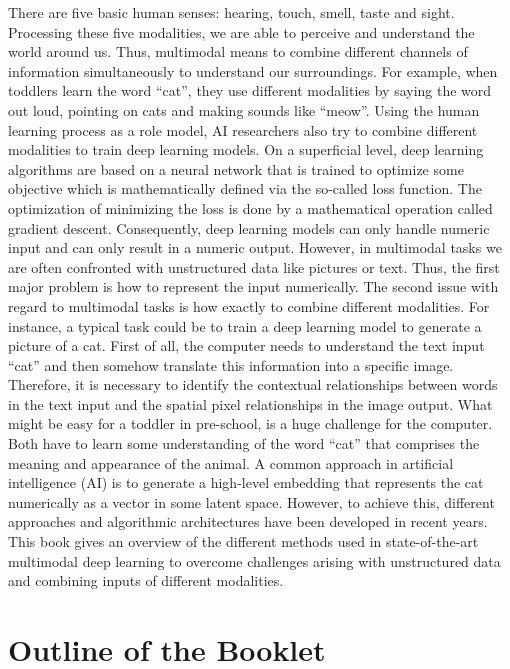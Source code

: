 \documentclass[
]{krantz}
\begin{document}
There are five basic human senses: hearing, touch, smell, taste and sight. Processing these five modalities, we are able to perceive and understand the world around us. Thus, multimodal means to combine different channels of information simultaneously to understand our surroundings. For example, when toddlers learn the word ``cat'', they use different modalities by saying the word out loud, pointing on cats and making sounds like ``meow''. Using the human learning process as a role model, AI researchers also try to combine different modalities to train deep learning models. On a superficial level, deep learning algorithms are based on a neural network that is trained to optimize some objective which is mathematically defined via the so-called loss function. The optimization of minimizing the loss is done by a mathematical operation called gradient descent. Consequently, deep learning models can only handle numeric input and can only result in a numeric output. However, in multimodal tasks we are often confronted with unstructured data like pictures or text. Thus, the first major problem is how to represent the input numerically. The second issue with regard to multimodal tasks is how exactly to combine different modalities. For instance, a typical task could be to train a deep learning model to generate a picture of a cat. First of all, the computer needs to understand the text input ``cat'' and then somehow translate this information into a specific image. Therefore, it is necessary to identify the contextual relationships between words in the text input and the spatial pixel relationships in the image output. What might be easy for a toddler in pre-school, is a huge challenge for the computer. Both have to learn some understanding of the word ``cat'' that comprises the meaning and appearance of the animal. A common approach in artificial intelligence (AI) is to generate a high-level embedding that represents the cat numerically as a vector in some latent space. However, to achieve this, different approaches and algorithmic architectures have been developed in recent years. This book gives an overview of the different methods used in state-of-the-art multimodal deep learning to overcome challenges arising with unstructured data and combining inputs of different modalities.

\hypertarget{outline-of-the-booklet}{%
\section{Outline of the Booklet}\label{outline-of-the-booklet}}
\end{document}
